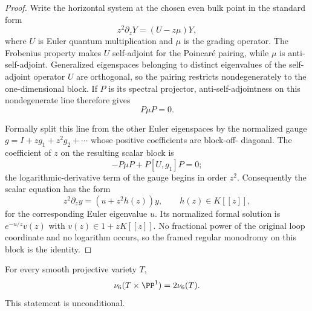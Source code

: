 \begin{proof}
Write the horizontal system at the chosen even bulk point in the standard form
\[
 z^2\partial_zY=(U-z\mu)Y,
\]
where $U$ is Euler quantum multiplication and $\mu$ is the grading operator.
The Frobenius property makes $U$ self-adjoint for the Poincar\'e pairing,
while $\mu$ is anti-self-adjoint.  Generalized eigenspaces belonging to
distinct eigenvalues of the self-adjoint operator $U$ are orthogonal, so the
pairing restricts nondegenerately to the one-dimensional block.  If $P$ is
its spectral projector, anti-self-adjointness on this nondegenerate line
therefore gives
\[
 P\mu P=0.
\]

Formally split this line from the other Euler eigenspaces by the normalized
gauge $g=I+zg_1+z^2g_2+\cdots$ whose positive coefficients are block-off-
diagonal.  The coefficient of $z$ on the resulting scalar block is
\[
 -P\mu P+P[U,g_1]P=0;
\]
the logarithmic-derivative term of the gauge begins in order $z^2$.
Consequently the scalar equation has the form
\[
 z^2\partial_zy=(u+z^2h(z))y,
 \qquad h(z)\in K[[z]],
\]
for the corresponding Euler eigenvalue $u$.  Its normalized formal solution
is $e^{-u/z}v(z)$ with $v(z)\in1+zK[[z]]$.  No fractional power of the
original loop coordinate and no logarithm occurs, so the framed regular
monodromy on this block is the identity.
\end{proof}

\begin{proposition}
\label{prop:projective-product-nu}
%
%
For every smooth projective variety $T$,
\[
 \nu_6(T\times\PP^1)=2\nu_6(T).
\]
This statement is unconditional.
\end{proposition}

